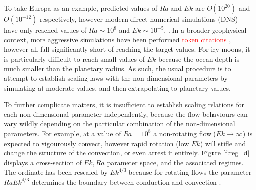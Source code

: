 \documentclass{article}
\def\lb{\left(}
\def\rb{\right)}
\begin{document}
%

To take Europa as an example, predicted values of $Ra$ and  $Ek$ are $O\lb 10^{20}\rb $ and $O\lb 10^{-12}\rb $ respectively, however modern direct numerical simulations (DNS) have only reached values of $Ra \sim 10^{8}$ and $Ek \sim 10^{-5}.$ \citep{dL23}. In a broader geophysical context, more aggressive simulations have been performed \textcolor{red}{token citations \citep{cG19}}, however all fall significantly short of reaching the target values. For icy moons, it is particularly difficult to reach small values of $Ek$ because the ocean depth is much smaller than the planetary radius. As such, the usual procedure is to attempt to establish scaling laws with the non-dimensional parameters by simulating at moderate values, and then extrapolating to planetary values.

To further complicate matters, it is insufficient to establish scaling relations for each non-dimensional parameter independently, because the flow behaviours can vary wildly depending on the particular combination of the non-dimensional parameters. 
For example, at a value of $Ra = 10^{8}$ a non-rotating flow ($Ek\rightarrow \infty$) is expected to vigourously convect, however rapid rotation (low  $Ek$) will stifle and change the structure of the convection, or even arrest it entirely. 
Figure \ref{f:reg_d} displays a cross-section of $Ek,Ra$ parameter space, and the associated regimes. The ordinate has been rescaled by $Ek^{4/3}$ because for rotating flows the parameter $RaEk^{4/3}$ determines the boundary between conduction and convection \citep{sC61}.
\end{document}
